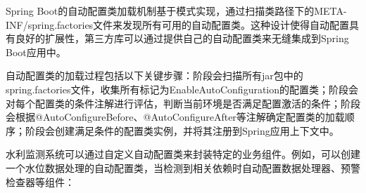 Spring Boot的自动配置类加载机制基于模式实现，通过扫描类路径下的META-INF/spring.factories文件来发现所有可用的自动配置类。这种设计使得自动配置具有良好的扩展性，第三方库可以通过提供自己的自动配置类来无缝集成到Spring Boot应用中。

自动配置类的加载过程包括以下关键步骤：阶段会扫描所有jar包中的spring.factories文件，收集所有标记为EnableAutoConfiguration的配置类；阶段会对每个配置类的条件注解进行评估，判断当前环境是否满足配置激活的条件；阶段会根据@AutoConfigureBefore、@AutoConfigureAfter等注解确定配置类的加载顺序；阶段会创建满足条件的配置类实例，并将其注册到Spring应用上下文中。

水利监测系统可以通过自定义自动配置类来封装特定的业务组件。例如，可以创建一个水位数据处理的自动配置类，当检测到相关依赖时自动配置数据处理器、预警检查器等组件：


